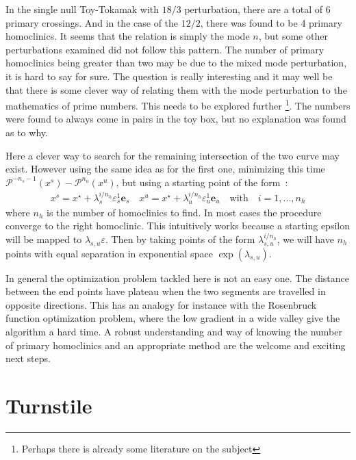 In the single null Toy-Tokamak with $18/3$ perturbation, there are a total of 6 primary crossings. And in the case of the $12/2$, there was found to be 4 primary homoclinics. It seems that the relation is simply the mode $n$, but some other perturbations examined did not follow this pattern. The number of primary homoclinics being greater than two may be due to the mixed mode perturbation, it is hard to say for sure. The question is really interesting and it may well be that there is some clever way of relating them with the mode perturbation to the mathematics of prime numbers. This needs to be explored further \footnote{Perhaps there is already some literature on the subject}. The numbers were found to always come in pairs in the toy box, but no explanation was found as to why.

Here a clever way to search for the remaining intersection of the two curve may exist. However using the same idea as for the first one, minimizing this time $\mathcal{P}^{-n_s-1}(x^s) - \mathcal{P}^{n_u}(x^u)$, but using a starting point of the form~:     
\begin{align*}
       x^s = x^\star+\lambda_s^{i/n_h}\varepsilon_s^1 \textbf{e}_s \quad
x^u = x^\star+\lambda_u^{i/n_h}\varepsilon_u^1 \textbf{e}_u \quad\text{with}\quad i = 1,...,n_h
\end{align*}
where $n_h$ is the number of homoclinics to find. In most cases the procedure converge to the right homoclinic. This intuitively works because a starting epsilon will be mapped to $\lambda_{s,u}\varepsilon$. Then by taking points of the form $\lambda_{s,u}^{i/n_h}$, we will have $n_h$ points with equal separation in exponential space $\exp(\lambda_{s,u})$.

In general the optimization problem tackled here is not an easy one. The distance between the end points have plateau when the two segments are travelled in opposite directions. This has an analogy for instance with the Rosenbruck function optimization problem, where the low gradient in a wide valley give the algorithm a hard time. A robust understanding and way of knowing the number of primary homoclinics and an appropriate method are the welcome and exciting next steps.

\section{Turnstile}

